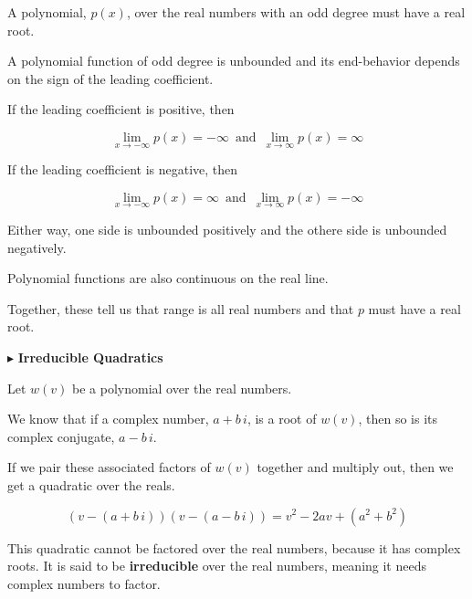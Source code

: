 \documentclass{ximera}
\begin{document}
\begin{explanation}


A polynomial, $p(x)$, over the real numbers with an odd degree must have a real root. 




A polynomial function of odd degree is unbounded and its end-behavior depends on the sign of the leading coefficient.



If the leading coefficient is positive, then 

\[   \lim\limits_{x \to -\infty} p(x) = -\infty    \,   \text{ and } \,       \lim\limits_{x \to \infty} p(x) = \infty      \]



If the leading coefficient is negative, then 

\[   \lim\limits_{x \to -\infty} p(x) = \infty    \,   \text{ and } \,       \lim\limits_{x \to \infty} p(x) = -\infty      \]


Either way, one side is unbounded positively and the othere side is unbounded negatively. 



Polynomial functions are also continuous on the real line. 


Together, these tell us that range is all real numbers and that $p$ must have a real root.




\end{explanation}








$\blacktriangleright$  \textbf{Irreducible Quadratics}


Let $w(v)$ be a polynomial over the real numbers.

We know that if a complex number, $a + b \, i$, is a root of $w(v)$, then so is its complex conjugate, $a - b \,i$.

If we pair these associated factors of $w(v)$ together and multiply out, then we get a quadratic over the reals.

\[    (v - (a + b \, i)) (v -(a - b \, i))  = v^2 - 2a v + (a^2 + b^2)      \]


This quadratic cannot be factored over the real numbers, because it has complex roots.  It is said to be \textbf{irreducible} over the real numbers, meaning it needs complex numbers to factor.
\end{document}
